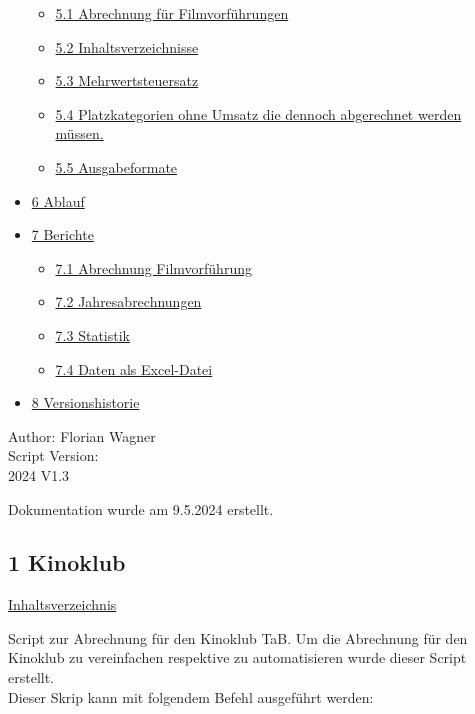 \documentclass[
]{article}
\providecommand{\tightlist}{%
  \setlength{\itemsep}{0pt}\setlength{\parskip}{0pt}}
\begin{document}
\begin{itemize}
  \begin{itemize}
  \tightlist
  \item
    \hyperref[A_5.1_Abrechnungux5cux2520fuxfcrux5cux2520Filmvorfuxfchrungen]{5.1
    Abrechnung für Filmvorführungen}
  \item
    \hyperref[A_5.2_Inhaltsverzeichnisse]{5.2 Inhaltsverzeichnisse}
  \item
    \hyperref[A_5.3_Mehrwertsteuersatz]{5.3 Mehrwertsteuersatz}
  \item
    \hyperref[A_5.4_Platzkategorienux5cux2520ohneux5cux2520Umsatzux5cux2520dieux5cux2520dennochux5cux2520abgerechnetux5cux2520werdenux5cux2520muxfcssen.]{5.4
    Platzkategorien ohne Umsatz die dennoch abgerechnet werden müssen.}
  \item
    \hyperref[A_5.5_Ausgabeformate]{5.5 Ausgabeformate}
  \end{itemize}
\item
  \hyperref[A_6_Ablauf]{6 Ablauf}
\item
  \hyperref[A_7_Berichte]{7 Berichte}

  \begin{itemize}
  \tightlist
  \item
    \hyperref[A_7.1_Abrechnungux5cux2520Filmvorfuxfchrung]{7.1
    Abrechnung Filmvorführung}
  \item
    \hyperref[A_7.2_Jahresabrechnungen]{7.2 Jahresabrechnungen}
  \item
    \hyperref[A_7.3_Statistik]{7.3 Statistik}
  \item
    \hyperref[A_7.4_Datenux5cux2520alsux5cux2520Excel-Datei]{7.4 Daten
    als Excel-Datei}
  \end{itemize}
\item
  \hyperref[A_8_Versionshistorie]{8 Versionshistorie}
\end{itemize}

Author: Florian Wagner\\
Script Version:\\
2024 V1.3

Dokumentation wurde am 9.5.2024 erstellt.

\newpage

\subsection{1 Kinoklub}\label{kinoklub}

\hyperref[Inhaltsverzeichnis]{Inhaltsverzeichnis}

Script zur Abrechnung für den Kinoklub TaB. Um die Abrechnung für den
Kinoklub zu vereinfachen respektive zu automatisieren wurde dieser
Script erstellt.\\
Dieser Skrip kann mit folgendem Befehl ausgeführt werden:
\end{document}
